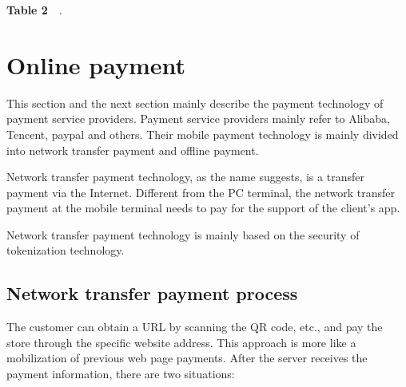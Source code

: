 \documentclass[journal]{IEEEtran}
\begin{document}
\begin{center}
\textbf{Table 2}~~.\\
\end{center}



\section{Online payment}
This section and the next section mainly describe the payment technology of payment service providers. Payment service providers mainly refer to Alibaba, Tencent, paypal and others. Their mobile payment technology is mainly divided into network transfer payment and offline payment.


Network transfer payment technology, as the name suggests, is a transfer payment via the Internet. Different from the PC terminal, the network transfer payment at the mobile terminal needs to pay for the support of the client's app.

Network transfer payment technology is mainly based on the security of tokenization technology.

\subsection{Network transfer payment process}
The customer can obtain a URL by scanning the QR code, etc., and pay the store through the specific website address. This approach is more like a mobilization of previous web page payments. After the server receives the payment information, there are two situations:
\end{document}
